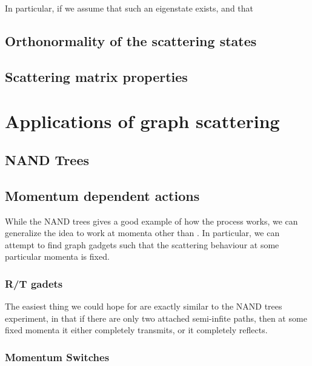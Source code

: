 \documentclass[../thesis-main/thesis-main]{subfiles}
\begin{document}
In particular, if we assume that such an eigenstate exists, and that 

\subsection{Orthonormality of the scattering states}



\subsection{Scattering matrix properties}


\section{Applications of graph scattering}

\subsection{NAND Trees}


\subsection{Momentum dependent actions}

While the NAND trees gives a good example of how the process works, we can generalize the idea to work at momenta other than .  In particular, we can attempt to find graph gadgets such that the scattering behaviour at some particular momenta is fixed.

\subsubsection{R/T gadets}

The easiest thing we could hope for are exactly similar to the NAND trees experiment, in that if there are only two attached semi-infite paths, then at some fixed momenta it either completely transmits, or it completely reflects.  

\subsubsection{Momentum Switches}
\end{document}
